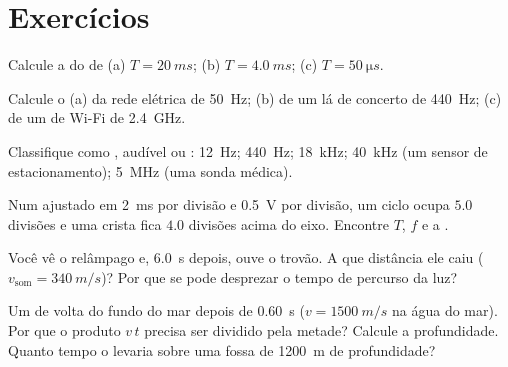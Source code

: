 \section{Exercícios}

\begin{exercise}[$\star$]\label{exo:g10:signals-and-waves:1}
Calcule a  do  de  (a)
$T = \qty{20}{ms}$; (b) $T = \qty{4.0}{ms}$; (c)
$T = \qty{50}{\micro s}$.
\end{exercise}

\begin{exercise}[$\star$]\label{exo:g10:signals-and-waves:2}
Calcule o  (a) da rede elétrica de \qty{50}{Hz}; (b) de um lá de
concerto de \qty{440}{Hz}; (c) de um  de Wi-Fi de \qty{2.4}{GHz}.
\end{exercise}

\begin{exercise}[$\star$]\label{exo:g10:signals-and-waves:3}
Classifique como ,  audível ou : \qty{12}{Hz};
\qty{440}{Hz}; \qty{18}{kHz}; \qty{40}{kHz} (um sensor de
estacionamento); \qty{5}{MHz} (uma sonda médica).
\end{exercise}

\begin{exercise}[$\star$]\label{exo:g10:signals-and-waves:4}
Num  ajustado em \qty{2}{ms} por divisão e \qty{0.5}{V} por
divisão, um ciclo ocupa $5.0$ divisões e uma crista fica $4.0$ divisões
acima do eixo. Encontre $T$, $f$ e a .
\end{exercise}

\begin{exercise}[$\star$]\label{exo:g10:signals-and-waves:5}
Você vê o relâmpago e, \qty{6.0}{s} depois, ouve o trovão. A que
distância ele caiu ($v_{\text{som}} = \qty{340}{m/s}$)? Por que se pode
desprezar o tempo de percurso da luz?
\end{exercise}

\begin{exercise}[$\star\star$]\label{exo:g10:signals-and-waves:6}
Um  de  volta do fundo do mar depois de \qty{0.60}{s}
($v = \qty{1500}{m/s}$ na água do mar). Por que o produto $v\,t$ precisa
ser dividido pela metade? Calcule a profundidade. Quanto tempo o 
levaria sobre uma fossa de \qty{1200}{m} de profundidade?
\end{exercise}

